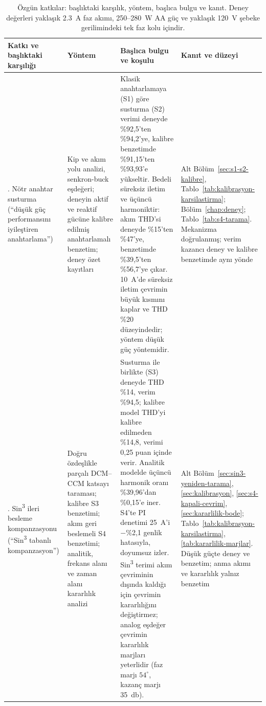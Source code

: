 \begin{table}[htbp]
  \centering
  \caption{Özgün katkılar: başlıktaki karşılık, yöntem, başlıca bulgu ve kanıt. Deney değerleri yaklaşık \SI{2.3}{\ampere} faz akımı, \num{250}--\SI{280}{\watt} AA güç ve yaklaşık \SI{120}{\volt} şebeke gerilimindeki tek faz kolu içindir.}
  \label{tab:katki-yontem-kanit}
  \footnotesize
  \setlength{\tabcolsep}{3pt}
  \begin{tabularx}{\textwidth}{@{}>{\raggedright\arraybackslash}p{}>{\raggedright\arraybackslash}p{}>{\raggedright\arraybackslash}X>{\raggedright\arraybackslash}p{}@{}}
    \toprule
    \textbf{Katkı ve başlıktaki karşılığı} & \textbf{Yöntem} & \textbf{Başlıca bulgu ve koşulu} & \textbf{Kanıt ve düzeyi} \\
    \midrule
    1. Nötr anahtar susturma (``düşük güç performansını iyileştiren anahtarlama'') &
    Kip ve akım yolu analizi, senkron-buck eşdeğeri; deneyin aktif ve reaktif gücüne kalibre edilmiş anahtarlamalı benzetim; deney özet kayıtları &
    Klasik anahtarlamaya (S1) göre susturma (S2) verimi deneyde \%92,5'ten \%94,2'ye, kalibre benzetimde \%91,15'ten \%93,93'e yükseltir. Bedeli süreksiz iletim ve üçüncü harmoniktir: akım THD'si deneyde \%15'ten \%47'ye, benzetimde \%39,5'ten \%56,7'ye çıkar. \SI{10}{\ampere}'de süreksiz iletim çevrimin büyük kısmını kaplar ve THD \%20 düzeyindedir; yöntem düşük güç yöntemidir. &
    Alt Bölüm~\ref{sec:s1-s2-kalibre}, Tablo~\ref{tab:kalibrasyon-karsilastirma}; Bölüm~\ref{chap:deney}; Tablo~\ref{tab:s4-tarama}. Mekanizma doğrulanmış; verim kazancı deney ve kalibre benzetimde aynı yönde \\
    \addlinespace
    2. Sin\textsuperscript{3} ileri besleme kompanzasyonu (``Sin\textsuperscript{3} tabanlı kompanzasyon'') &
    Doğru özdeşlikle parçalı DCM--CCM katsayı taraması; kalibre S3 benzetimi; akım geri beslemeli S4 benzetimi; analitik, frekans alanı ve zaman alanı kararlılık analizi &
    Susturma ile birlikte (S3) deneyde THD \%14, verim \%94,5; kalibre model THD'yi kalibre edilmeden \%14,8, verimi 0,25 puan içinde verir. Analitik modelde üçüncü harmonik oranı \%39,96'dan \%0,15'e iner. S4'te PI denetimi \SI{25}{\ampere}'i $-$\%2,1 genlik hatasıyla, doyumsuz izler. Sin\textsuperscript{3} terimi akım çevriminin dışında kaldığı için çevrimin kararlılığını değiştirmez; analog eşdeğer çevrimin kararlılık marjları yeterlidir (faz marjı $54^{\circ}$, kazanç marjı \SI{35}{\decibel}). &
    Alt Bölüm~\ref{sec:sin3-yeniden-tarama}, \ref{sec:kalibrasyon}, \ref{sec:s4-kapali-cevrim}, \ref{sec:kararlilik-bode}; Tablo~\ref{tab:kalibrasyon-karsilastirma}, \ref{tab:kararlilik-marjlar}. Düşük güçte deney ve benzetim; anma akımı ve kararlılık yalnız benzetim \\

\end{tabularx}
\end{table}

